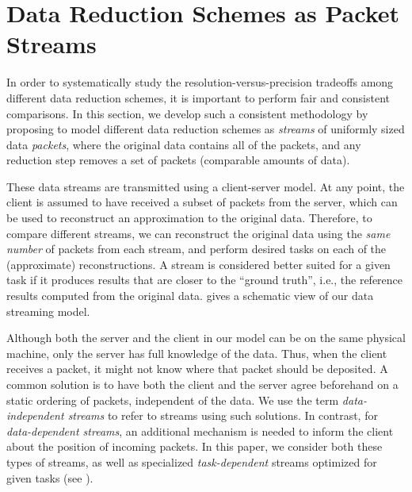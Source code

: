 \section{Data Reduction Schemes as Packet Streams}\label{sec:terminologies}

In order to systematically study the resolution-versus-precision tradeoffs among different data
reduction schemes, it is important to perform fair and consistent comparisons.  In this section, we
develop such a consistent methodology by proposing to model different data reduction schemes as
\emph{streams} of uniformly sized data \emph{packets}, where the original data contains all of the
packets, and any reduction step removes a set of packets (comparable amounts of data).

These data streams are transmitted using a client-server model. At any point, the client is assumed
to have received a subset of packets from the server, which can be used to reconstruct an
approximation to the original data. Therefore, to compare different streams, we can reconstruct the
original data using the \emph{same number} of packets from each stream, and perform desired tasks on
each of the (approximate) reconstructions. A stream is considered better suited for a given task if
it produces results that are closer to the ``ground truth'', i.e., the reference results computed
from the original data.  gives a schematic view of our data streaming model.

Although both the server and the client in our model can be on the same physical machine, only the
server has full knowledge of the data. Thus, when the client receives a packet, it might not know
where that packet should be deposited. A common solution is to have both the client and the server
agree beforehand on a static ordering of packets, independent of the data. We use the term
\emph{data-independent streams} to refer to streams using such solutions. In contrast, for
\emph{data-dependent streams}, an additional mechanism is needed to inform the client about the
position of incoming packets.  In this paper, we consider both these types of streams, as well as
specialized \emph{task-dependent} streams optimized for given tasks (see ).

